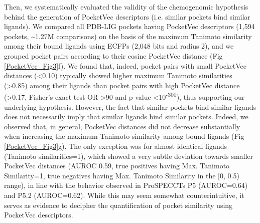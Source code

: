 Then, we systematically evaluated the validity of the chemogenomic hypothesis behind the generation of PocketVec descriptors (i.e. similar pockets bind similar ligands). We compared all PDB-LIG pockets having PocketVec descriptors (1,594 pockets, \textasciitilde1.27M comparisons) on the basis of the maximum Tanimoto similarity among their bound ligands using ECFPs (2,048 bits and radius 2), and we grouped pocket pairs according to their cosine PocketVec distance (Fig \ref{PocketVec_Fig3}f). We found that, indeed, pocket pairs with small PocketVec distances (<0.10) typically showed higher maximum Tanimoto similarities (>0.85) among their ligands than pocket pairs with high PocketVec distance (>0.17, Fisher’s exact test OR >90 and p-value <10\textsuperscript{-300}), thus supporting our underlying hypothesis. However, the fact that similar pockets bind similar ligands does not necessarily imply that similar ligands bind similar pockets. Indeed, we observed that, in general, PocketVec distances did not decrease substantially when increasing the maximum Tanimoto similarity among bound ligands (Fig \ref{PocketVec_Fig3}g). The only exception was for almost identical ligands (Tanimoto similarities=1), which showed a very subtle deviation towards smaller PocketVec distances (AUROC 0.59, true positives having Max. Tanimoto Similarity=1, true negatives having Max. Tanimoto Similarity in the [0, 0.5) range), in line with the behavior observed in ProSPECCTs P5 (AUROC=0.64) and P5.2 (AUROC=0.62). While this may seem somewhat counterintuitive, it serves as evidence to decipher the quantification of pocket similarity using PocketVec descriptors. 

